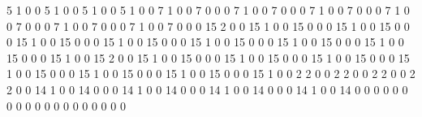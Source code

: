 5
1
0
0
5
1
0
0
5
1
0
0
5
1
0
0
7
1
0
0
7
0
0
0
7
1
0
0
7
0
0
0
7
1
0
0
7
0
0
0
7
1
0
0
7
0
0
0
7
1
0
0
7
0
0
0
7
1
0
0
7
0
0
0
15
2
0
0
15
1
0
0
15
0
0
0
15
1
0
0
15
0
0
0
15
1
0
0
15
0
0
0
15
1
0
0
15
0
0
0
15
1
0
0
15
0
0
0
15
1
0
0
15
0
0
0
15
1
0
0
15
0
0
0
15
1
0
0
15
2
0
0
15
1
0
0
15
0
0
0
15
1
0
0
15
0
0
0
15
1
0
0
15
0
0
0
15
1
0
0
15
0
0
0
15
1
0
0
15
0
0
0
15
1
0
0
15
0
0
0
15
1
0
0
2
2
0
0
2
2
0
0
2
2
0
0
2
2
0
0
14
1
0
0
14
0
0
0
14
1
0
0
14
0
0
0
14
1
0
0
14
0
0
0
14
1
0
0
14
0
0
0
0
0
0
0
0
0
0
0
0
0
0
0
0
0
0
0
